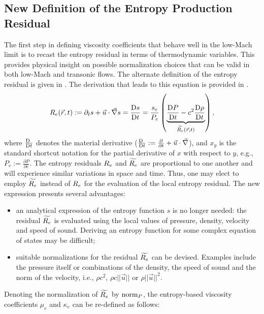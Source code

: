 \subsection{New Definition of the Entropy Production Residual}\label{sec:new_ent_prod} 

The first step in defining viscosity coefficients that behave well in the low-Mach limit is to recast the entropy residual in terms of thermodynamic variables. This provides physical insight on possible normalization choices that can be valid in both low-Mach and transonic flows. The alternate definition of the entropy residual is given in . The derivation that leads to this equation is provided in . 
%
\begin{equation}
\label{eq:ent_res}
R_e(\vec{r},t) := \partial_t s + \vec{u} \cdot \vec{\nabla} s = \frac{\textrm{D} s}{\textrm{D} t} = \frac{s_e}{P_e} \left( \underbrace{\frac{\textrm{D} P}{\textrm{D} t} - c^2 \frac{\textrm{D} \rho}{\textrm{D} t} }_{\widetilde{R_e}(\vec{r},t)} \right) ,
\end{equation} 
%
where $\frac{\textrm{D} \ }{\textrm{D} t}$ denotes the material derivative ($\frac{\textrm{D} \ }{\textrm{D} t}:= \frac{\partial}{\partial t} + \vec{u} \cdot \vec{\nabla}$), and $x_y$ is the standard shortcut notation for the partial derivative of $x$ with respect to $y$, e.g., $P_e:=\frac{\partial P}{\partial e}$. 
%
The entropy residuals $R_e$ and $\widetilde{R_e}$ are proportional to one another and will experience similar variations in space and time. Thus, one may elect to employ $\widetilde{R_e}$ instead of $R_e$ for the evaluation of the local entropy residual. The new expression presents several advantages:
%
\begin{itemize}
\item an analytical expression of the entropy function $s$ is no longer needed: the residual $\widetilde{R_e}$ is evaluated using the local values of pressure, density, velocity and speed of sound. Deriving an entropy function for some complex equation of states may be difficult;
\item suitable normalizations for the residual $\widetilde{R_e}$ can be devised. Examples include the pressure itself or combinations of the density, the speed of sound and the norm of the velocity, i.e., $\rho c^2$, $\rho c || \vec{u} ||$ or $\rho || \vec{u} ||^2$. 
\end{itemize}
%
Denoting the normalization of $\widetilde{R_e}$ by $\textrm{norm}_P$, the entropy-based viscosity coefficients $\mu_e$ and $\kappa_e$ can be re-defined as follows:
